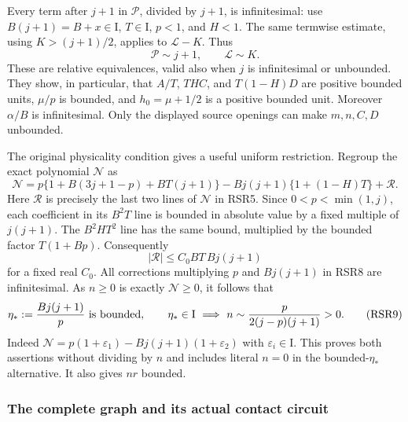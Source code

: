 Every term after $j+1$ in $\mathcal P$, divided by $j+1$, is
infinitesimal: use $B(j+1)=B+x\in\mathrm I$, $T\in\mathrm I$,
$p<1$, and $H<1$. The same termwise estimate, using
$K>(j+1)/2$, applies to $\mathcal L-K$. Thus
\[
 \mathcal P\sim j+1,\qquad \mathcal L\sim K.
 \tag{RSR7}
\]
These are relative equivalences, valid also when $j$ is infinitesimal
or unbounded. They show, in particular, that $A/T$, $THC$, and
$T(1-H)D$ are positive bounded units, $\mu/p$ is bounded, and
$h_0=\mu+1/2$ is a positive bounded unit. Moreover $\alpha/B$ is
infinitesimal. Only the displayed source openings can make $m,n,C,D$
unbounded.

The original physicality condition gives a useful uniform restriction.
Regroup the exact polynomial $\mathcal N$ as
\[
\mathcal N=p\{1+B(3j+1-p)+BT(j+1)\}
 -Bj(j+1)\{1+(1-H)T\}+\mathcal R.
 \tag{RSR8}
\]
Here $\mathcal R$ is precisely the last two lines of $\mathcal N$
in RSR5. Since $0<p<\min(1,j)$, each coefficient in its $B^2T$
line is bounded in absolute value by a fixed multiple of $j(j+1)$.
The $B^2HT^2$ line has the same bound, multiplied by the bounded
factor $T(1+Bp)$. Consequently
\[
 |\mathcal R|\leq C_0BT\,Bj(j+1)
\]
for a fixed real $C_0$. All corrections multiplying $p$ and
$Bj(j+1)$ in RSR8 are infinitesimal. As $n\geq0$ is exactly
$\mathcal N\geq0$, it follows that
\[
 \eta_*:=\frac{Bj(j+1)}p\ \hbox{is bounded},\qquad
 \eta_*\in\mathrm I\ \Longrightarrow\
 n\sim\frac{p}{2(j-p)(j+1)}>0.
 \tag{RSR9}
\]
Indeed $\mathcal N=p(1+\varepsilon_1)-Bj(j+1)(1+\varepsilon_2)$
with $\varepsilon_i\in\mathrm I$. This proves both assertions without
dividing by $n$ and includes literal $n=0$ in the bounded-$\eta_*$
alternative. It also gives $nr$ bounded.

\subsubsection*{The complete graph and its actual contact circuit}

